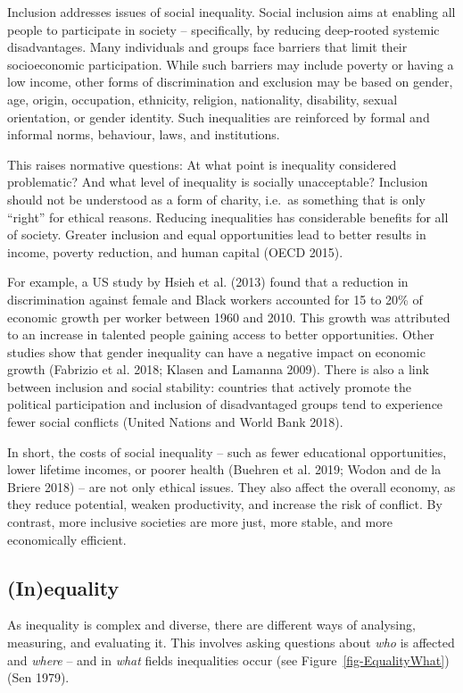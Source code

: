 \documentclass[
  a4paper,
  DIV=11,
  numbers=noendperiod,
  oneside,
  openany]{scrreprt}
\begin{document}
Inclusion addresses issues of social inequality. Social inclusion aims
at enabling all people to participate in society -- specifically, by
reducing deep-rooted systemic disadvantages. Many individuals and groups
face barriers that limit their socioeconomic participation. While such
barriers may include poverty or having a low income, other forms of
discrimination and exclusion may be based on gender, age, origin,
occupation, ethnicity, religion, nationality, disability, sexual
orientation, or gender identity. Such inequalities are reinforced by
formal and informal norms, behaviour, laws, and institutions.

This raises normative questions: At what point is inequality considered
problematic? And what level of inequality is socially unacceptable?
Inclusion should not be understood as a form of charity, i.e.~as
something that is only ``right'' for ethical reasons. Reducing
inequalities has considerable benefits for all of society. Greater
inclusion and equal opportunities lead to better results in income,
poverty reduction, and human capital (OECD 2015).

For example, a US study by Hsieh et al. (2013) found that a reduction in
discrimination against female and Black workers accounted for 15 to 20\%
of economic growth per worker between 1960 and 2010. This growth was
attributed to an increase in talented people gaining access to better
opportunities. Other studies show that gender inequality can have a
negative impact on economic growth (Fabrizio et al. 2018; Klasen and
Lamanna 2009). There is also a link between inclusion and social
stability: countries that actively promote the political participation
and inclusion of disadvantaged groups tend to experience fewer social
conflicts (United Nations and World Bank 2018).

In short, the costs of social inequality -- such as fewer educational
opportunities, lower lifetime incomes, or poorer health (Buehren et al.
2019; {Wodon and de la Briere} 2018) -- are not only ethical issues.
They also affect the overall economy, as they reduce potential, weaken
productivity, and increase the risk of conflict. By contrast, more
inclusive societies are more just, more stable, and more economically
efficient.

\subsection{(In)equality}\label{inequality}

As inequality is complex and diverse, there are different ways of
analysing, measuring, and evaluating it. This involves asking questions
about \emph{who} is affected and \emph{where} -- and in \emph{what}
fields inequalities occur (see Figure~\ref{fig-EqualityWhat}) (Sen
1979).
\end{document}
